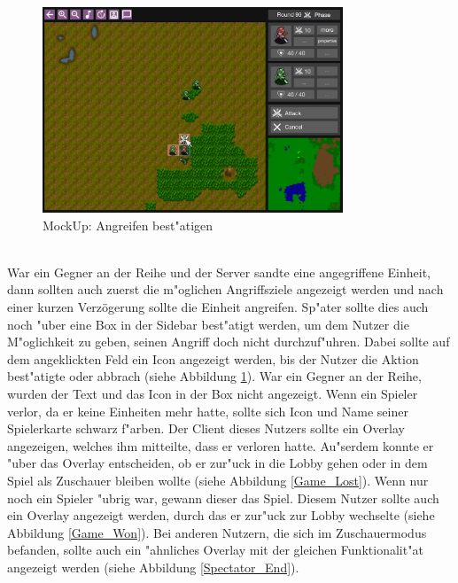 \documentclass[12pt, titlepage]{scrartcl}
\newcounter{subsubsubsection}[subsubsection]
\begin{document}
			        \begin{figure}[H] 
    				    \centering
    				    \includegraphics[width=0.8\textwidth]{images/mockUps/Attack.png}
    				    \caption{MockUp: Angreifen best"atigen}
    				    \label{Attack}
			        \end{figure}
		        	\ \\ War ein Gegner an der Reihe und der Server sandte eine angegriffene Einheit, dann sollten auch zuerst die m"oglichen Angriffsziele angezeigt werden und nach einer kurzen Verz\"ogerung sollte die Einheit angreifen. Sp"ater sollte dies auch noch "uber eine Box in der Sidebar best"atigt werden, um dem Nutzer die M"oglichkeit zu geben, seinen Angriff doch nicht durchzuf"uhren. Dabei sollte auf dem angeklickten Feld ein Icon angezeigt werden, bis der Nutzer die Aktion best"atigte oder abbrach (siehe Abbildung \ref{Attack}). War ein Gegner an der Reihe, wurden der Text und das Icon in der Box nicht angezeigt.
			        Wenn ein Spieler verlor, da er keine Einheiten mehr hatte, sollte sich Icon und Name seiner Spielerkarte schwarz f"arben. Der Client dieses Nutzers sollte ein Overlay angezeigen, welches ihm mitteilte, dass er verloren hatte. Au"serdem konnte er "uber das Overlay entscheiden, ob er zur"uck in die Lobby gehen oder in dem Spiel als Zuschauer bleiben wollte (siehe Abbildung \ref{Game_Lost}). Wenn nur noch ein Spieler "ubrig war, gewann dieser das Spiel. Diesem Nutzer sollte auch ein Overlay angezeigt werden, durch das er zur"uck zur Lobby wechselte (siehe Abbildung \ref{Game_Won}). Bei anderen Nutzern, die sich im Zuschauermodus befanden, sollte auch ein "ahnliches Overlay mit der gleichen Funktionalit"at angezeigt werden (siehe Abbildung \ref{Spectator_End}).
\end{document}

